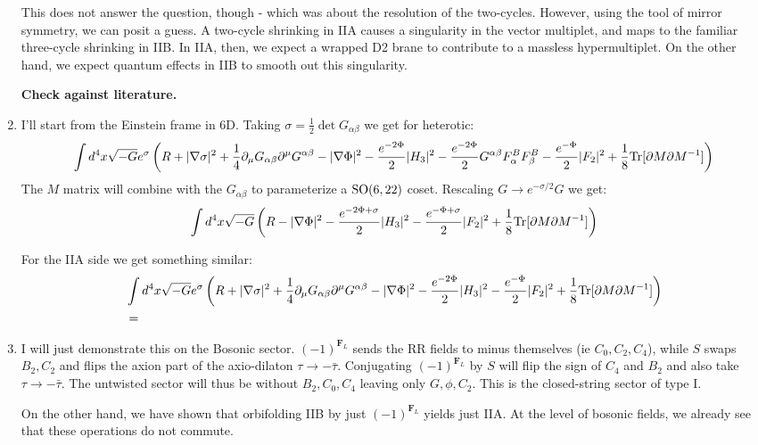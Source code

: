 \documentclass[11pt, class=article, crop=false]{standalone}
\begin{document}
\begin{enumerate}
	This does not answer the question, though - which was about the resolution of the two-cycles. However, using the tool of mirror symmetry, we can posit a guess. A two-cycle shrinking in IIA causes a singularity in the vector multiplet, and maps to the familiar three-cycle shrinking in IIB. In IIA, then, we expect a wrapped D2 brane to contribute to a massless hypermultiplet. On the other hand, we expect quantum effects in IIB to smooth out this singularity. 
	
	\textbf{Check against literature.}
	
	\item I'll start from the Einstein frame in 6D. Taking $\sigma = \frac12 \det G_{\alpha \beta}$ we get for heterotic: 
	\[
		\int d^4 x \sqrt{-G} e^{\sigma } \left(R + |\nabla \sigma|^2 + \frac14 \partial_\mu G_{\alpha \beta} \partial^\mu G^{\alpha \beta} - |\nabla \Phi|^2 - \frac{e^{-2\Phi}}{2} |H_3|^2 - \frac{e^{-2\Phi}}{2} G^{\alpha \beta} F^B_\alpha F^B_\beta - \frac{e^{-\Phi}}{2} |F_2|^2 + \frac18 \mathrm{Tr}[\partial M \partial M^{-1}] \right)
	\]
	The $M$ matrix will combine with the $G_{\alpha \beta}$ to parameterize a $\mathrm{SO}(6,22)$ coset. Rescaling $G \to e^{-\sigma/2} G$ we get:
	\[
		\int d^4 x \sqrt{-G} \left(R  - |\nabla \Phi|^2 - \frac{e^{-2\Phi + \sigma}}{2} |H_3|^2 - \frac{e^{-\Phi + \sigma}}{2} |F_2|^2 + \frac18 \mathrm{Tr}[\partial M \partial M^{-1}] \right)
	\]
	
	For the IIA side we get something similar:
	\[
	\begin{aligned}
		&\int d^4 x \sqrt{-G} e^{\sigma } \left(R + |\nabla \sigma|^2 + \frac14 \partial_\mu G_{\alpha \beta} \partial^\mu G^{\alpha \beta} - |\nabla \Phi|^2 - \frac{e^{-2\Phi}}{2} |H_3|^2 - \frac{e^{-\Phi}}{2} |F_2|^2 + \frac18 \mathrm{Tr}[\partial M \partial M^{-1}] \right)\\
		&=
	\end{aligned}
	\]
	
	\item I will just demonstrate this on the Bosonic sector. $(-1)^{\mathbf{F}_L}$ sends the RR fields to minus themselves (ie $C_0, C_2, C_4$), while $S$ swaps $B_2, C_2$ and flips the axion part of the axio-dilaton $\tau \to -\bar \tau$. Conjugating $(-1)^{\mathbf{F}_L}$ by $S$ will flip the sign of $C_4$ and $B_2$ and also take $\tau \to -\bar \tau$. The untwisted sector will thus be without $B_2, C_0, C_4$ leaving only $G, \phi, C_2$. This is the closed-string sector of type I. 
	
	On the other hand, we have shown that orbifolding IIB by just $(-1)^{\mathbf{F}_L}$ yields just IIA. At the level of bosonic fields, we already see that these operations do not commute. 
	

\end{enumerate}
\end{document}
